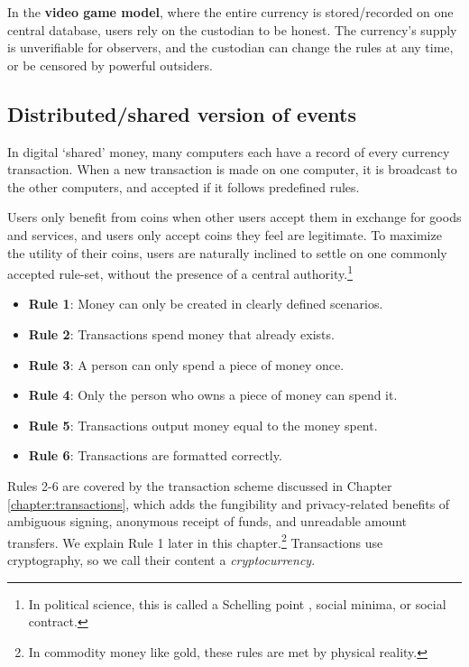 In the \textbf{video game model}, where the entire currency is stored/recorded on one central database, users rely on the custodian to be honest. The currency's supply is unverifiable for observers, and the custodian can change the rules at any time, or be censored by powerful outsiders.


\subsection{Distributed/shared version of events}
\label{subsec:shared-version-events}

In digital `shared' money, many computers each have a record of every currency transaction. When a new transaction is made on one computer, it is broadcast to the other computers, and accepted if it follows predefined rules.

Users only benefit from coins when other users accept them in exchange for goods and services, and users only accept coins they feel are legitimate. To maximize the utility of their coins, users are naturally inclined to settle on one commonly accepted rule-set, without the presence of a central authority.\footnote{In political science, this is called a Schelling point \cite{friedman-schelling}, social minima, or social contract.}
\begin{itemize}
    \item[] \textbf{Rule 1}: Money can only be created in clearly defined scenarios.
    \item[] \textbf{Rule 2}: Transactions spend money that already exists.
    \item[] \textbf{Rule 3}: A person can only spend a piece of money once.
    \item[] \textbf{Rule 4}: Only the person who owns a piece of money can spend it.
    \item[] \textbf{Rule 5}: Transactions output money equal to the money spent.
    \item[] \textbf{Rule 6}:  Transactions are formatted correctly.
\end{itemize}

Rules 2-6 are covered by the transaction scheme discussed in Chapter \ref{chapter:transactions}, which adds the fungibility and privacy-related benefits of ambiguous signing, anonymous receipt of funds, and unreadable amount transfers. We explain Rule 1 later in this chapter.\footnote{In commodity money like gold, these rules are met by physical reality.} Transactions use cryptography, so we call their content a {\em cryptocurrency}.

